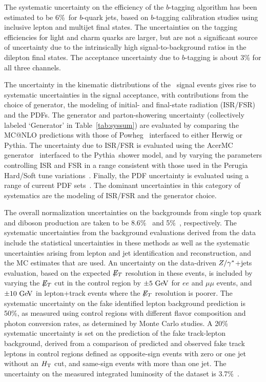 The systematic uncertainty on the efficiency of the $b$-tagging algorithm has been estimated to be $6$\%\ for $b$-quark jets, based on $b$-tagging calibration studies using inclusive lepton and multijet final states.
The uncertainties on the tagging efficiencies for light and charm quarks are larger, but are not a significant source of uncertainty due to the
intrinsically high signal-to-background ratios in the dilepton final states.
The acceptance uncertainty due to $b$-tagging is about 3\% for all three channels.

The uncertainty in the kinematic distributions of the \ttbar\ signal events
gives rise to systematic uncertainties in
the signal acceptance, with contributions from the choice of generator, the modeling of initial- and final-state
radiation (ISR/FSR) and the PDFs.
The generator and parton-showering uncertainty (collectively labeled
`Generator' in Table~\ref{tab:syssum}) are evaluated by comparing the
{\sc MC@NLO} predictions  with those of
{\sc Powheg}~\cite{powheg,Frixione:2007vw,Alioli:2010xd} interfaced to
either {\sc Herwig} or {\sc Pythia}.
The uncertainty due to ISR/FSR is evaluated using the {\sc AcerMC} generator~\cite{Acer}
interfaced to the {\sc Pythia}\ shower model, and by varying the parameters controlling ISR
and FSR in a range consistent with those used in the Perugia Hard/Soft tune variations~\cite{Skands}.
Finally, the PDF uncertainty is evaluated using a range of
current PDF sets~\cite{cteq6l}.
The dominant uncertainties in this category of systematics are the
modeling of ISR/FSR and the generator choice.

The overall normalization uncertainties on the backgrounds from
single top quark and diboson production are taken to be
8.6\%~\cite{PhysRevD.83.091503} and 5\%~\cite{Campbell:2010ff},
respectively.
%
The systematic uncertainties from the background evaluations derived from the data include the statistical uncertainties in these methods as well as the systematic uncertainties arising from lepton and jet identification and reconstruction, and the MC estimates that are used.
An uncertainty on the data-driven $Z/\gamma^{*}$+jets evaluation, based on the
expected $\not\!\!{E_{T}}$ resolution in these events, is included by varying the
$\not\!\!{E_{T}}$ cut in the control region by $\pm 5\GeV$ for $ee$ and $\mu\mu$
events, and $\pm 10\GeV$ in lepton+track events where the $\not\!\!{E_{T}}$
resolution is poorer.
The systematic uncertainty on the fake identified lepton background prediction is 50\%, as measured using control regions with different flavor composition and photon conversion rates, as determined by Monte Carlo studies. A 20\% systematic uncertainty is set on the prediction of the fake track-lepton background, derived from a comparison of predicted and observed fake track leptons in control
regions defined as opposite-sign events with zero or one jet without an $H_{\mathrm{T}}$ cut, and same-sign events with more than one jet.
%
The uncertainty on the measured integrated luminosity of the dataset
is 3.7\%~\cite{lumi}.

